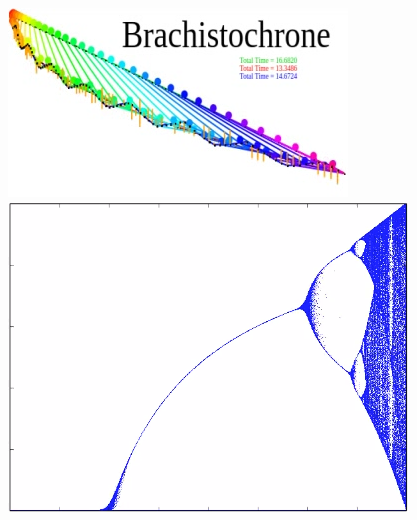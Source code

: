 \documentclass[../r.tex]{subfiles}
\begin{document}
\noindent
\href{https://twitter.com/randompast/status/897526013437018114}{\includegraphics[scale=0.6]{../scientific/brachistochrone.png}}
\href{https://twitter.com/randompast/status/984569577697882112}{\includegraphics[scale=0.35]{../scientific/logistic.png}}
\end{document}
